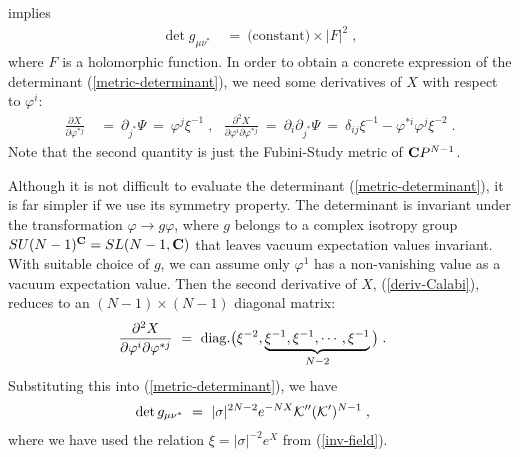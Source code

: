 \documentclass[a4paper,11pt]{article}
\newcommand{\Pd}[2]{\frac{\partial{#1}}{\partial{#2}}}
\newcommand{\del}{\partial}
\begin{document}
{implies
\begin{align}
\det g_{\mu \nu^*} \ &= \ \mbox{(constant)} \times |F|^2 \; ,
\label{RF-condition}
\end{align}
where $F$ is a holomorphic function.
In order to obtain a concrete expression of 
the determinant (\ref{metric-determinant}),
we need some derivatives of $X$ with respect to $\varphi^i$: 
\begin{align}
\Pd{X}{\varphi^{*j}} 
\ &= \ 
\del_{j^*} \Psi \ = \ \varphi^j \xi^{-1} \; , \ \ \ 
\frac{\del^2 X}{\del \varphi^i \del \varphi^{*j}} 
\ = \ 
\del_i \del_{j^*} \Psi 
\ = \ 
\delta_{i j} \xi^{-1} - \varphi^{* i} \varphi^{j} \xi^{-2} \; . 
\label{deriv-Calabi}
\end{align}
Note that the second quantity is just 
the Fubini-Study metric of ${\bf C}P^{N-1}$. 

Although
it is not difficult to evaluate the determinant
(\ref{metric-determinant}),
it is far simpler if we use its symmetry property.
The determinant is invariant under the transformation $\varphi \to g
\varphi$, 
where $g$ belongs to a complex isotropy group 
$SU(N-1)^{\bf C} = SL(N-1, {\bf C})$ 
that leaves vacuum expectation values invariant.
With suitable choice of $g$, 
we can assume only $\varphi^1$ has a non-vanishing value 
as a vacuum expectation value.
Then the second derivative of $X$, (\ref{deriv-Calabi}), 
reduces to an $(N-1) \times (N-1)$
diagonal matrix:
\begin{align}
\frac{\del^2 X}{\del \varphi^i \del \varphi^{*j}} 
\ &= \ 
{\rm diag.} 
\big( 
\xi^{-2} , \underbrace{\xi^{-1}, \xi^{-1} , \cdots , \xi^{-1}}_{N-2} 
\big) \; . 
\end{align}
Substituting this into (\ref{metric-determinant}),
we have
\begin{align}
\det g_{\mu \nu^*} 
\ &= \
|\sigma|^{2N - 2} e^{-N X} {\cal K}'' ({\cal K}')^{N-1} \; ,
\end{align}
where we have used the relation $\xi = |\sigma|^{-2} e^X$ from
(\ref{inv-field}).

}
\end{document}
